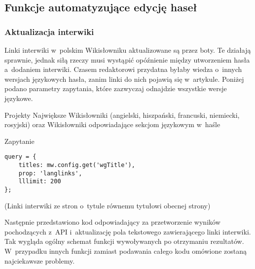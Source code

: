 \subsection{Funkcje automatyzujące edycję haseł}

\subsubsection{Aktualizacja interwiki}
Linki interwiki w~polskim Wikisłowniku aktualizowane są przez boty. Te działają sprawnie, jednak siłą rzeczy musi wystąpić opóźnienie między utworzeniem hasła a~dodaniem interwiki. Czasem redaktorowi przydatna byłaby wiedza o~innych wersjach językowych hasła, zanim linki do nich pojawią się w~artykule. Poniżej podano parametry zapytania, które zazwyczaj odnajdzie wszystkie wersje językowe.

\begin{opis}
\item[Projekty] Największe Wikisłowniki (angielski, hiszpański, francuski, niemiecki, rosyjski) oraz Wikisłowniki odpowiadające sekcjom językowym w~haśle
\item[Zapytanie]
\begin{verbatim}
query = {
    titles: mw.config.get('wgTitle'),
    prop: 'langlinks',
    lllimit: 200
};
\end{verbatim}
(Linki interwiki ze stron o~tytule równemu tytułowi obecnej strony)
\end{opis}

Następnie przedstawiono kod odpowiadający za przetworzenie wyników pochodzących z~API i~aktualizację pola tekstowego zawierającego linki interwiki. Tak wygląda ogólny schemat funkcji wywoływanych po otrzymaniu rezultatów. W~przypadku innych funkcji zamiast podawania całego kodu omówione zostaną najciekawsze problemy.

